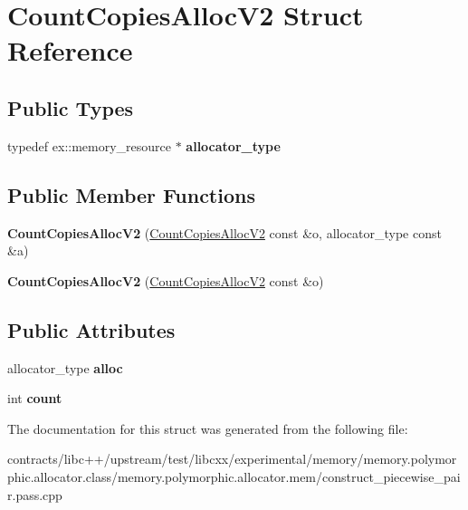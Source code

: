 \hypertarget{struct_count_copies_alloc_v2}{}\section{Count\+Copies\+Alloc\+V2 Struct Reference}
\label{struct_count_copies_alloc_v2}
\subsection*{Public Types}
\begin{DoxyCompactItemize}
\item 
\mbox{\label{struct_count_copies_alloc_v2_a60172d66ef105223564c3fdc9240332f}} 
typedef ex\+::memory\+\_\+resource $\ast$ {\bfseries allocator\+\_\+type}
\end{DoxyCompactItemize}
\subsection*{Public Member Functions}
\begin{DoxyCompactItemize}
\item 
\mbox{\label{struct_count_copies_alloc_v2_a1af867610f25c3cf7ee51bb58218479b}} 
{\bfseries Count\+Copies\+Alloc\+V2} (\mbox{\hyperlink{struct_count_copies_alloc_v2}{Count\+Copies\+Alloc\+V2}} const \&o, allocator\+\_\+type const \&a)
\item 
\mbox{\label{struct_count_copies_alloc_v2_a08b12b56a4e10ef2c38362ec9f30753d}} 
{\bfseries Count\+Copies\+Alloc\+V2} (\mbox{\hyperlink{struct_count_copies_alloc_v2}{Count\+Copies\+Alloc\+V2}} const \&o)
\end{DoxyCompactItemize}
\subsection*{Public Attributes}
\begin{DoxyCompactItemize}
\item 
\mbox{\label{struct_count_copies_alloc_v2_a03e318972ded54183ffa432d78e694a0}} 
allocator\+\_\+type {\bfseries alloc}
\item 
\mbox{\label{struct_count_copies_alloc_v2_aaf574fb0a9acfa936acc6c6c0744ae64}} 
int {\bfseries count}
\end{DoxyCompactItemize}


The documentation for this struct was generated from the following file\+:\begin{DoxyCompactItemize}
\item 
contracts/libc++/upstream/test/libcxx/experimental/memory/memory.\+polymorphic.\+allocator.\+class/memory.\+polymorphic.\+allocator.\+mem/construct\+\_\+piecewise\+\_\+pair.\+pass.\+cpp\end{DoxyCompactItemize}
